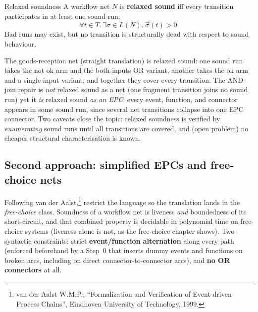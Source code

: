 \begin{definitionbox}{Relaxed soundness}
A workflow net $N$ is \textbf{relaxed sound} iff every transition participates in at least one sound run:
\[
  \forall t \in T.\ \exists \sigma \in L(N).\ \vec{\sigma}(t) > 0.
\]
Bad runs may exist, but no transition is structurally dead with respect to sound behaviour.
\end{definitionbox}

The goods-reception net (straight translation) is relaxed sound: one sound run takes the \textsf{not ok} arm and the both-inputs OR variant, another takes the \textsf{ok} arm and a single-input variant, and together they cover every transition. The AND-join repair is \emph{not} relaxed sound as a net (one fragment transition joins no sound run) yet it \emph{is} relaxed sound \emph{as an EPC}: every event, function, and connector appears in some sound run, since several net transitions collapse into one EPC connector. Two caveats close the topic: relaxed soundness is verified by \emph{enumerating} sound runs until all transitions are covered, and (open problem) no cheaper structural characterisation is known.

\subsection{Second approach: simplified EPCs and free-choice nets}

Following van der Aalst,\footnote{van der Aalst W.M.P., ``Formalization and Verification of Event-driven Process Chains'', Eindhoven University of Technology, 1999.} restrict the language so the translation lands in the \emph{free-choice} class. Soundness of a workflow net is liveness \emph{and} boundedness of its short-circuit, and that combined property is decidable in polynomial time on free-choice systems (liveness alone is not, as the free-choice chapter shows). Two syntactic constraints: strict \textbf{event/function alternation} along every path (enforced beforehand by a Step~0 that inserts dummy events and functions on broken arcs, including on direct connector-to-connector arcs), and \textbf{no OR connectors} at all.

